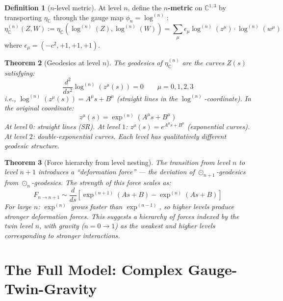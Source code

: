\documentclass[12pt]{article}
\theoremstyle{plain}
\newtheorem{theorem}{Theorem}[section]
\theoremstyle{definition}
\newtheorem{definition}[theorem]{Definition}
\theoremstyle{remark}
\newcommand{\CC}{\mathbb{C}}
\begin{document}
\begin{definition}[$n$-level metric]\label{def:n-metric}
At level $n$, define the \textbf{$n$-metric} on $\CC^{1,3}$ by transporting $\eta_\CC$ through the gauge map $\phi_n = \log^{(n)}$:
\begin{equation}
\eta_\CC^{(n)}(Z, W) := \eta_\CC(\log^{(n)}(Z), \log^{(n)}(W)) = \sum_\mu \epsilon_\mu \log^{(n)}(z^\mu) \cdot \log^{(n)}(w^\mu)
\end{equation}
where $\epsilon_\mu = (-c^2, +1, +1, +1)$.
\end{definition}

\begin{theorem}[Geodesics at level $n$]\label{thm:n-geodesics}
The geodesics of $\eta_\CC^{(n)}$ are the curves $Z(s)$ satisfying:
\begin{equation}
\frac{d^2}{ds^2}\log^{(n)}(z^\mu(s)) = 0 \qquad \mu = 0, 1, 2, 3
\end{equation}
i.e., $\log^{(n)}(z^\mu(s)) = A^\mu s + B^\mu$ (straight lines in the $\log^{(n)}$-coordinate). In the original coordinate:
\begin{equation}
z^\mu(s) = \exp^{(n)}(A^\mu s + B^\mu)
\end{equation}
At level $0$: straight lines (SR). At level $1$: $z^\mu(s) = e^{A^\mu s + B^\mu}$ (exponential curves). At level $2$: double-exponential curves. Each level has qualitatively different geodesic structure.
\end{theorem}

\begin{theorem}[Force hierarchy from level nesting]\label{thm:force-hierarchy}
The transition from level $n$ to level $n+1$ introduces a ``deformation force'' --- the deviation of $\odot_{n+1}$-geodesics from $\odot_n$-geodesics. The strength of this force scales as:
\begin{equation}
F_{n \to n+1} \sim \frac{d}{ds}\left[\exp^{(n+1)}(A s + B) - \exp^{(n)}(A s + B)\right]
\end{equation}
For large $n$: $\exp^{(n)}$ grows faster than $\exp^{(n-1)}$, so higher levels produce stronger deformation forces. This suggests a hierarchy of forces indexed by the twin level $n$, with gravity ($n = 0 \to 1$) as the weakest and higher levels corresponding to stronger interactions.
\end{theorem}


\section{The Full Model: Complex Gauge-Twin-Gravity}
\label{sec:full-model}
\end{document}
